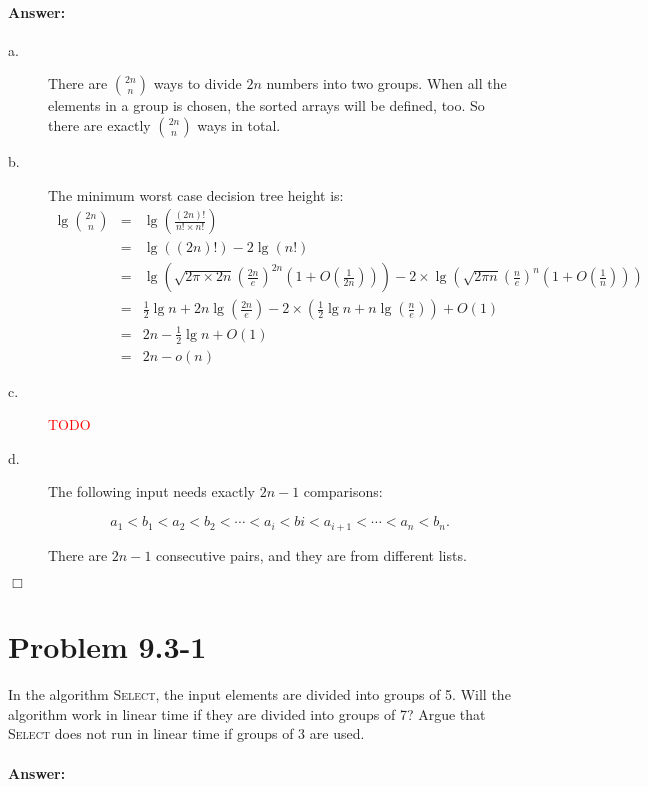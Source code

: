 \documentclass[a4paper,10pt]{article}
\newcommand{\problem}[1]{\section*{Problem #1}}
\newcommand{\answer}{\paragraph{Answer:}}
\newcommand{\qed}{\hfill \ensuremath{\Box}}
\newcommand{\todo}{\textcolor{red}{TODO}{} }
\begin{document}
\answer

\begin{description}
\item[a. \hspace{9pt}] There are $2n \choose n$ ways to divide $2n$ numbers into two groups. When all the elements in a group
is chosen, the sorted arrays will be defined, too. So there are exactly $2n \choose n$ ways in total.

\item[b. \hspace{9pt}] The minimum worst case decision tree height is:
\begin{eqnarray*}
\lg{2n \choose n} &=&\lg\left(\frac{(2n)!}{n!\times n!}\right) \\
    &=&\lg\left((2n)!\right) - 2\lg\left(n!\right) \\
    &=& \lg\left(\sqrt{2\pi\times 2n}\left(\frac{2n}{e}\right)^{2n}\left(1 +O\left(\frac{1}{2n}\right)\right)\right) 
        - 2\times\lg\left(\sqrt{2\pi n}\left(\frac{n}{e}\right)^{n}\left(1 +O\left(\frac{1}{n}\right)\right)\right)\\
    &=& \frac{1}{2}\lg{n} + 2n\lg\left(\frac{2n}{e}\right) 
        - 2\times\left(   \frac{1}{2}\lg{n} + n\lg\left(\frac{n}{e}\right)   \right) + O(1)\\
    &=& 2n - \frac{1}{2}\lg{n} + O(1)\\
    &=& 2n - o(n)
\end{eqnarray*}

\item[c. \hspace{9pt}]  \todo

\item[d. \hspace{9pt}]  The following input needs exactly $2n-1$ comparisons:

$$a_1 < b_1 < a_2 < b_2 < \cdots < a_{i} < b{i} < a_{i+1} < \cdots < a_n < b_n.$$

There are $2n-1$ consecutive pairs, and they are from different lists.

\end{description}

\qed



\problem{9.3-1}
In the algorithm \textsc{Select}, the input elements are divided into groups of 5.
Will the algorithm work in linear time if they are divided into groups of 7? Argue that
\textsc{Select} does not run in linear time if groups of 3 are used.
\answer
\end{document}
